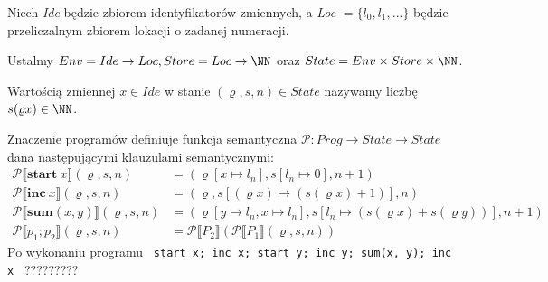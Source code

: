\begin{solutions}
    \sol Niech \textit{Ide} będzie zbiorem identyfikatorów zmiennych, a \textit{Loc} $= \{l_0, l_1, ...\}$ będzie przeliczalnym zbiorem lokacji o zadanej numeracji.
    
    Ustalmy $Env = Ide \to Loc, Store = Loc \to \NN$ oraz $State = Env \times Store \times \NN$.
    
    Wartością zmiennej $x \in Ide$ w stanie $(\varrho, s, n) \in State$ nazywamy liczbę $s(\varrho x) \in \NN$.
    
    Znaczenie programów definiuje funkcja semantyczna $\mathcal{P} : Prog \to State \to State$ dana następującymi klauzulami semantycznymi:
    \begin{align*}
        \mathcal{P} \llbracket \textbf{start} \ x \rrbracket (\varrho, s, n) &= (\varrho[x \mapsto l_n], s[l_n \mapsto 0], n + 1) \\
        \mathcal{P} \llbracket \textbf{inc} \ x \rrbracket (\varrho, s, n) &= (\varrho, s[(\varrho x) \mapsto (s(\varrho x) + 1)], n) \\
        \mathcal{P} \llbracket \textbf{sum}(x, y) \rrbracket (\varrho, s, n) &= (\varrho[y \mapsto l_n, x \mapsto l_n], s[l_n \mapsto (s(\varrho x) + s(\varrho y))], n + 1) \\
        \mathcal{P} \llbracket p_1; p_2 \rrbracket (\varrho, s, n) &= \mathcal{P} \llbracket P_2 \rrbracket(\mathcal{P} \llbracket P_1 \rrbracket(\varrho, s, n))
    \end{align*}
    Po wykonaniu programu \texttt{
        start x;
        inc x;
        start y;
        inc y;
        sum(x, y);
        inc x
    }
    {???}{???}{???}

    \textbf{}
\end{solutions}